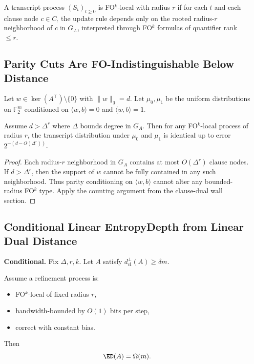 \begin{definition}
A transcript process $(S_t)_{t\ge 0}$ is FO\texorpdfstring{$^k$}{k}-local
with radius $r$ if for each $t$ and each clause node $c\in C$,
the update rule depends only on the rooted radius-$r$ neighborhood
of $c$ in $G_A$, interpreted through FO\texorpdfstring{$^k$}{k} formulas
of quantifier rank $\le r$.
\end{definition}

\subsection{Parity Cuts Are FO-Indistinguishable Below Distance}

Let $w \in \ker(A^\top)\setminus\{0\}$ with
$\|w\|_0 = d$.
Let $\mu_0,\mu_1$ be the uniform distributions on $\mathbb{F}_2^m$
conditioned on $\langle w,b\rangle=0$ and $\langle w,b\rangle=1$.

\begin{lemma}
Assume $d > \Delta^r$ where $\Delta$ bounds degree in $G_A$.
Then for any FO\texorpdfstring{$^k$}{k}-local process of radius $r$,
the transcript distribution under $\mu_0$ and $\mu_1$
is identical up to error $2^{-(d - O(\Delta^r))}$.
\end{lemma}

\begin{proof}
Each radius-$r$ neighborhood in $G_A$ contains at most
$O(\Delta^r)$ clause nodes.
If $d > \Delta^r$, then the support of $w$
cannot be fully contained in any such neighborhood.
Thus parity conditioning on $\langle w,b\rangle$
cannot alter any bounded-radius FO\texorpdfstring{$^k$}{k} type.
Apply the counting argument from the clause-dual wall section.
\end{proof}

\subsection{Conditional Linear EntropyDepth from Linear Dual Distance}

\begin{theorem}
\textbf{Conditional.}
Fix $\Delta,r,k$.
Let $A$ satisfy $d^\perp_{\mathrm{cl}}(A) \ge \delta m$.

Assume a refinement process is:
\begin{itemize}
\item FO\texorpdfstring{$^k$}{k}-local of fixed radius $r$,
\item bandwidth-bounded by $O(1)$ bits per step,
\item correct with constant bias.
\end{itemize}

Then
\[
\ED(A) = \Omega(m).
\]
\end{theorem}

